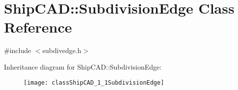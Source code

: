 \hypertarget{classShipCAD_1_1SubdivisionEdge}{}\section{Ship\+C\+AD\+:\+:Subdivision\+Edge Class Reference}
\label{classShipCAD_1_1SubdivisionEdge}


{\ttfamily \#include $<$subdivedge.\+h$>$}

Inheritance diagram for Ship\+C\+AD\+:\+:Subdivision\+Edge\+:\begin{figure}[H]
\begin{center}
\leavevmode
\texttt{[image: classShipCAD\_1\_1SubdivisionEdge]}
\end{center}
\end{figure}
